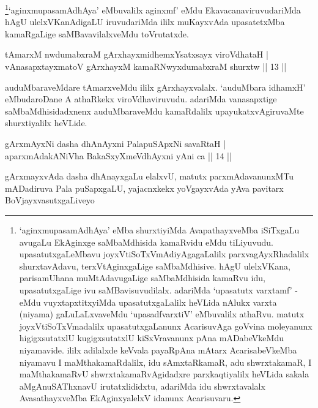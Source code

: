 \begin{artha}
\footnote{`aginxmupasamAdhAya' eMba shurxtiyiMda AvapathayxveMba iSiTxgaLu avugaLu EkAginxge saMbaMdhisida kamaRvidu eMdu tiLiyuvudu. upasatutxgaLeMbavu joyxVtiSoTxVmAdiyAgagaLalilx parxvagAyxRhadalilx shurxtavAdavu, terxVtAginxgaLige saMbaMdhisive. hAgU ulelxVKana, parisamUhana muMtAdavugaLige saMbaMdhisida kamaRvu idu, upasatutxgaLige ivu saMBavisuvudilalx. adariMda `upasatutx varxtamf' - eMdu vuyxtapxtitxyiMda upasatutxgaLalilx heVLida nAlukx varxta (niyama) gaLuLaLxvaveMdu `upasadfvarxtiV' eMbuvalilx athaRvu. matutx joyxVtiSoTxVmadalilx upasatutxgaLanunx AcarisuvAga goVvina moleyanunx higigxsutatxlU kugigxsutatxlU kiSxVravanunx pAna mADabeVkeMdu niyamavide. ililx adilalxde keVvala payaRpAna mAtarx AcarisabeVkeMba niyamavu I maMthakamaRdalilx, idu sAmxtaRkamaR, adu shwrxtakamaR, I maMthakamaRvU shwrxtakamaRvAgidadxre parxkaqtiyalilx heVLida sakala aMgAnuSAThxnavU irutatxlididxtu, adariMda idu shwrxtavalalx AvasathayxveMba EkAginxyalelxV idanunx Acarisuvaru.}`aginxmupasamAdhAya' eMbuvalilx aginxmf' eMdu EkavacanaviruvudariMda hAgU ulelxVKanAdigaLU iruvudariMda ililx muKayxvAda upasatetxMba kamaRgaLige saMBavavilalxveMdu toVrutatxde.
\end{artha}


\begin{shl}
tAmarxM nwdumabxraM gArxhayxmidhemxYsatxsayx viroVdhataH | \\
vAnasapxtayxmatoV gArxhayxM kamaRNwyxdumabxraM shurxtw \hfill|| 13 || 
\end{shl}

\begin{artha}
auduMbaraveMdare tAmarxveMdu ililx gArxhayxvalalx. `auduMbara idhamxH' eMbudaroDane A athaRkekx viroVdhaviruvudu. adariMda vanasapxtige saMbaMdhisidadxnenx auduMbaraveMdu kamaRdalilx upayukatxvAgiruvaMte shurxtiyalilx heVLide.
\end{artha}


\begin{shl}
gArxmAyxNi dasha dhAnAyxni PalapuSApxNi savaRtaH | \\
aparxmAdakANiVha BakaSxyXmeVdhAyxni yAni ca \hfill|| 14 || 
\end{shl}

\begin{artha}
gArxmayxvAda dasha dhAnayxgaLu elalxvU, matutx parxmAdavanunxMTu mADadiruva Pala puSapxgaLU, yajacnxkekx yoVgayxvAda yAva pavitarx BoVjayxvasutxgaLiveyo 
\end{artha}

